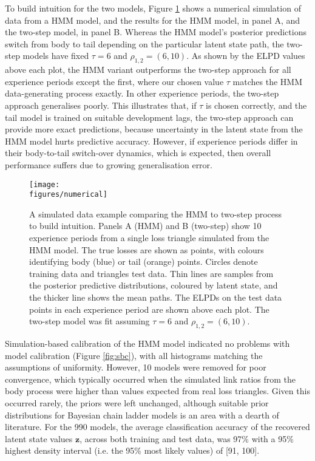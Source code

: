 To build intuition for the two models,
Figure \ref{fig:numerical} shows a numerical
simulation of data from a HMM model,
and the results for the HMM model,
in panel A, and the
two-step model, in panel B.
Whereas the HMM model's posterior predictions
switch from body to tail depending on
the particular latent state path,
the two-step models have fixed
$\tau = 6$ and $\rho_{1,2} = (6, 10)$.
As shown by the ELPD values above each
plot, the HMM variant outperforms
the two-step approach for all
experience periods except the first,
where our chosen value $\tau$
matches the HMM data-generating process
exactly. In other experience
periods, the two-step approach
generalises poorly. This illustrates that,
if $\tau$ is chosen correctly, and the
tail model is trained on suitable development
lags, the two-step approach can provide
more exact predictions, because
uncertainty in the latent state
from the HMM model hurts predictive accuracy.
However, if
experience periods differ in their
body-to-tail switch-over dynamics,
which is expected, then overall
performance suffers due to
growing generalisation error.

\begin{figure}
    \hspace{-1.8cm}
    \texttt{[image: \\figures/numerical]}
    \caption{
        A simulated data example comparing the HMM
        to two-step process to build intuition.
        Panels A (HMM) and B (two-step) show
        10 experience periods from a single
        loss triangle simulated from the HMM
        model. The true losses
        are shown as points, with colours
        identifying
        body (blue) or tail (orange) points.
        Circles denote training data and
        triangles test data. Thin 
        lines are samples from the posterior
        predictive distributions, coloured
        by latent state, and the thicker
        line shows the mean paths.
        The ELPDs on the test data
        points in each experience period
        are shown above each plot.
        The two-step model was fit
        assuming $\tau = 6$ and
        $\rho_{1,2} = (6, 10)$.
    }
	\label{fig:numerical}
\end{figure}

Simulation-based calibration of the HMM model indicated
no problems with model calibration (Figure \ref{fig:sbc}),
with all histograms matching the assumptions of
uniformity. However, 10 models were removed for poor
convergence, which typically occurred when the simulated
link ratios from the body process were
higher than values expected from real loss triangles. 
Given this occurred rarely, the priors were left
unchanged, although suitable prior distributions
for Bayesian chain ladder models is an area
with a dearth of literature.
For the 990 models, 
the average classification accuracy of the recovered latent
state values $\bm{z}$, across
both training and test data, was 97\% with a 
95\% highest density interval (i.e. the 95\% most
likely values) of [91, 100].

